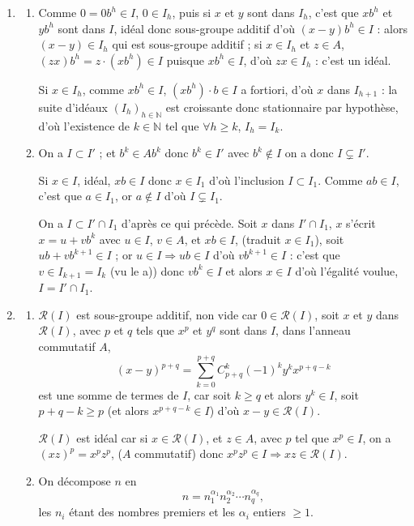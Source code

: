 \begin{enumerate}[label=\arabic*.,leftmargin=2.2em,itemsep=1.15em]
\item
\begin{enumerate}[label=\alph*),leftmargin=2em]
\item Comme $0=0b^h\in I$, $0\in I_h$, puis si $x$ et $y$ sont dans $I_h$, c'est que $xb^h$ et $yb^h$ sont dans $I$, idéal donc sous-groupe additif d'où $(x-y)b^h\in I$ : alors $(x-y)\in I_h$ qui est sous-groupe additif ; si $x\in I_h$ et $z\in A$, $(zx)b^h=z\cdot(xb^h)\in I$ puisque $xb^h\in I$, d'où $zx\in I_h$ : c'est un idéal.

Si $x\in I_h$, comme $xb^h\in I$, $(xb^h)\cdot b\in I$ a fortiori, d'où $x$ dans $I_{h+1}$ : la suite d'idéaux $(I_h)_{h\in\mathbb N}$ est croissante donc stationnaire par hypothèse, d'où l'existence de $k\in\mathbb N$ tel que $\forall h\ge k$, $I_h=I_k$.

\item On a $I\subset I'$ ; et $b^k\in Ab^k$ donc $b^k\in I'$ avec $b^k\notin I$ on a donc $I\subsetneq I'$.

Si $x\in I$, idéal, $xb\in I$ donc $x\in I_1$ d'où l'inclusion $I\subset I_1$. Comme $ab\in I$, c'est que $a\in I_1$, or $a\notin I$ d'où $I\subsetneq I_1$.

On a $I\subset I'\cap I_1$ d'après ce qui précède. Soit $x$ dans $I'\cap I_1$, $x$ s'écrit $x=u+vb^k$ avec $u\in I$, $v\in A$, et $xb\in I$, (traduit $x\in I_1$), soit $ub+vb^{k+1}\in I$ ; or $u\in I\Rightarrow ub\in I$ d'où $vb^{k+1}\in I$ : c'est que $v\in I_{k+1}=I_k$ (vu le a)) donc $vb^k\in I$ et alors $x\in I$ d'où l'égalité voulue, $I=I'\cap I_1$.
\end{enumerate}

\item
\begin{enumerate}[label=\alph*),leftmargin=2em]
\item $\mathcal R(I)$ est sous-groupe additif, non vide car $0\in\mathcal R(I)$, soit $x$ et $y$ dans $\mathcal R(I)$, avec $p$ et $q$ tels que $x^p$ et $y^q$ sont dans $I$, dans l'anneau commutatif $A$,
\[
(x-y)^{p+q}=\sum_{k=0}^{p+q}C_{p+q}^k(-1)^k y^k x^{p+q-k}
\]
est une somme de termes de $I$, car soit $k\ge q$ et alors $y^k\in I$, soit $p+q-k\ge p$ (et alors $x^{p+q-k}\in I$) d'où $x-y\in\mathcal R(I)$.

$\mathcal R(I)$ est idéal car si $x\in\mathcal R(I)$, et $z\in A$, avec $p$ tel que $x^p\in I$, on a $(xz)^p=x^pz^p$, ($A$ commutatif) donc $x^pz^p\in I\Rightarrow xz\in\mathcal R(I)$.

\item On décompose $n$ en
\[
n=n_1^{\alpha_1}n_2^{\alpha_2}\cdots n_q^{\alpha_q},
\]
les $n_i$ étant des nombres premiers et les $\alpha_i$ entiers $\ge1$.


\end{enumerate}
\end{enumerate}
